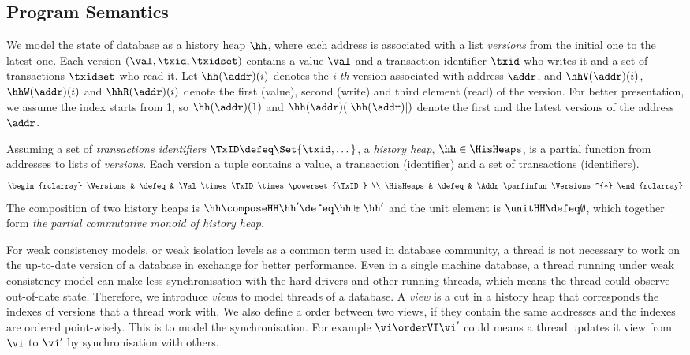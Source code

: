 \subsection{Program Semantics}

We model the state of database as a history heap \( \hh \), where each address is associated with a list \emph{versions} from the initial one to the latest one.
Each version \( ( \val, \txid, \txidset ) \) contains a value \( \val \) and a transaction identifier \( \txid \) who writes it and a set of transactions \( \txidset \) who read it.
Let \( \hh(\addr)(i)\) denotes the \emph{i-th} version associated with address \( \addr \), and \( \hhV(\addr)(i) \), \( \hhW(\addr)(i) \) and \( \hhR(\addr)(i) \) denote the first (value), second (write) and third element (read) of the version.
For better presentation, we assume the index starts from 1, so \( \hh(\addr)(1)\) and \( \hh(\addr)(\left|\hh(\addr)\right|)\) denote the first and the latest versions of the address \( \addr \).

\begin{defn}
\label{def:his_heap}
Assuming a set of \emph{transactions identifiers} \( \TxID \defeq \Set{\txid, \dots}\), a \emph{history heap}, \( \hh \in \HisHeaps \), is a partial function from addresses to lists of \emph{versions}.
Each version a tuple contains a value, a transaction (identifier) and a set of transactions (identifiers).
\[
\begin{rclarray}
    \Versions & \defeq &  \Val \times \TxID \times \powerset{\TxID} \\
    \HisHeaps & \defeq & \Addr \parfinfun \Versions^{*}
\end{rclarray}
\]
The composition of two history heaps is \( \hh \composeHH \hh' \defeq \hh \uplus \hh' \) and the unit element is \( \unitHH \defeq \emptyset \), which together form \emph{the partial commutative monoid of history heap}.
\end{defn}
 

For weak consistency models, or weak isolation levels as a common term used in database community, a thread is not necessary to work on the up-to-date version of a database in exchange for better performance. 
Even in a single machine database, a thread running under weak consistency model can make less synchronisation with the hard drivers and other running threads, which means the thread could observe out-of-date state.
Therefore, we introduce \emph{views} to model threads of a database.
A \emph{view} is a cut in a history heap that corresponds the indexes of versions that a thread work with.
We also define a order between two views, if they contain the same addresses and the indexes are ordered point-wisely.
This is to model the synchronisation.
For example \( \vi \orderVI \vi' \) could means a thread updates it view from \( \vi \) to \( \vi' \) by synchronisation with others.

